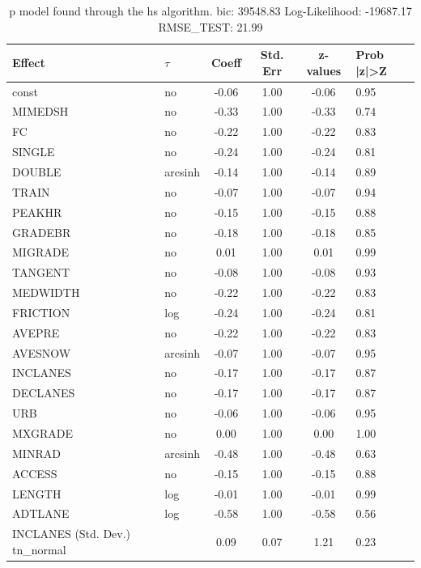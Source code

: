 \begin{table}
	\caption{p model found through the hs algorithm. bic: 39548.83 Log-Likelihood: -19687.17 RMSE_TEST: 21.99}
	\begin{center}
		\begin{tabular}{|l|l|c|c|c|l|}
			\hline
			Effect & $\tau$ & Coeff & Std. Err & z-values & Prob |z|>Z \\
			\hline
			const & no & -0.06 & 1.00 & -0.06 & 0.95 \\
			\hline
			MIMEDSH & no & -0.33 & 1.00 & -0.33 & 0.74 \\
			\hline
			FC & no & -0.22 & 1.00 & -0.22 & 0.83 \\
			\hline
			SINGLE & no & -0.24 & 1.00 & -0.24 & 0.81 \\
			\hline
			DOUBLE & arcsinh & -0.14 & 1.00 & -0.14 & 0.89 \\
			\hline
			TRAIN & no & -0.07 & 1.00 & -0.07 & 0.94 \\
			\hline
			PEAKHR & no & -0.15 & 1.00 & -0.15 & 0.88 \\
			\hline
			GRADEBR & no & -0.18 & 1.00 & -0.18 & 0.85 \\
			\hline
			MIGRADE & no & 0.01 & 1.00 & 0.01 & 0.99 \\
			\hline
			TANGENT & no & -0.08 & 1.00 & -0.08 & 0.93 \\
			\hline
			MEDWIDTH & no & -0.22 & 1.00 & -0.22 & 0.83 \\
			\hline
			FRICTION & log & -0.24 & 1.00 & -0.24 & 0.81 \\
			\hline
			AVEPRE & no & -0.22 & 1.00 & -0.22 & 0.83 \\
			\hline
			AVESNOW & arcsinh & -0.07 & 1.00 & -0.07 & 0.95 \\
			\hline
			INCLANES & no & -0.17 & 1.00 & -0.17 & 0.87 \\
			\hline
			DECLANES & no & -0.17 & 1.00 & -0.17 & 0.87 \\
			\hline
			URB & no & -0.06 & 1.00 & -0.06 & 0.95 \\
			\hline
			MXGRADE & no & 0.00 & 1.00 & 0.00 & 1.00 \\
			\hline
			MINRAD & arcsinh & -0.48 & 1.00 & -0.48 & 0.63 \\
			\hline
			ACCESS & no & -0.15 & 1.00 & -0.15 & 0.88 \\
			\hline
			LENGTH & log & -0.01 & 1.00 & -0.01 & 0.99 \\
			\hline
			ADTLANE & log & -0.58 & 1.00 & -0.58 & 0.56 \\
			\hline
			INCLANES (Std. Dev.) tn_normal &  & 0.09 & 0.07 & 1.21 & 0.23 \\

\end{tabular}
\end{center}
\end{table}
